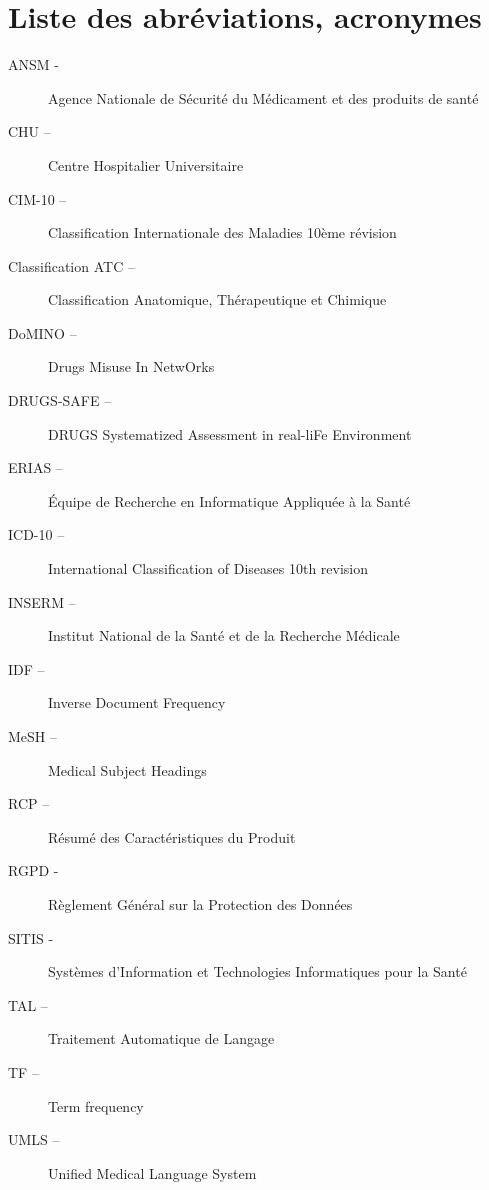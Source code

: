 \documentclass[a4paper, 11pt, openany, oneside, abstract=on]{report}
\begin{document}
\section*{Liste des abréviations, acronymes}
\begin{description}
\item[ANSM -] Agence Nationale de Sécurité du Médicament et des produits de santé
\item[CHU –] Centre Hospitalier Universitaire
\item[CIM-10 –] Classification Internationale des Maladies 10ème révision
\item[Classification ATC –] Classification Anatomique, Thérapeutique et Chimique
\item[DoMINO –] \begin{it}Drugs Misuse In NetwOrks\end{it}
\item[DRUGS-SAFE –] \begin{it}DRUGS Systematized Assessment in real-liFe Environment\end{it}
\item[ERIAS –] Équipe de Recherche en Informatique Appliquée à la Santé
\item[ICD-10 –] \begin{it}International Classification of Diseases 10th revision\end{it}
\item[INSERM –] Institut National de la Santé et de la Recherche Médicale
\item[IDF –] \begin{it}Inverse Document Frequency\end{it}
\item[MeSH –] \begin{it}Medical Subject Headings\end{it}
\item[RCP –] Résumé des Caractéristiques du Produit
\item[RGPD -] Règlement Général sur la Protection des Données
\item[SITIS -] Systèmes d’Information et Technologies Informatiques pour la Santé
\item[TAL –] Traitement Automatique de Langage
\item[TF –] \begin{it}Term frequency\end{it}
\item[UMLS –] \begin{it}Unified Medical Language System\end{it}
\end{description}
\end{document}
